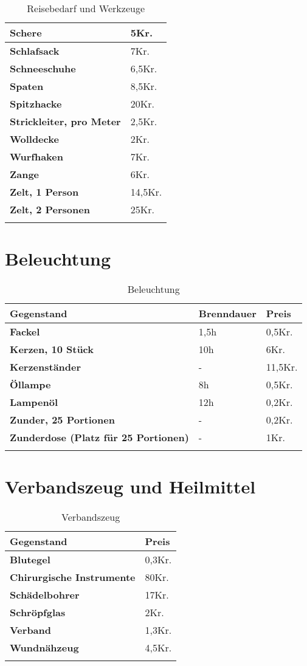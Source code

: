 \begin{longtable}{|p{5cm}|p{2cm}|}
\textbf{Schere} & 5Kr. \\ \hline
\textbf{Schlafsack} & 7Kr. \\ \hline
\textbf{Schneeschuhe} & 6,5Kr. \\ \hline
\textbf{Spaten} & 8,5Kr. \\ \hline
\textbf{Spitzhacke} & 20Kr. \\ \hline
\textbf{Strickleiter, pro Meter} & 2,5Kr. \\ \hline
\textbf{Wolldecke} & 2Kr. \\ \hline
\textbf{Wurfhaken} & 7Kr. \\ \hline
\textbf{Zange} & 6Kr. \\ \hline
\textbf{Zelt, 1 Person} & 14,5Kr. \\ \hline
\textbf{Zelt, 2 Personen} & 25Kr. \\ \hline

\caption{Reisebedarf und Werkzeuge}
\label{tab:ReisebedarfUndWerkzeuge}
\end{longtable}


\section{Beleuchtung}
\begin{longtable}{|p{5cm}|p{2cm}|p{2cm}|}
\hline
\textbf{Gegenstand} & \textbf{Brenndauer} & \textbf{Preis} \\ \hline
\textbf{Fackel} & 1,5h & 0,5Kr. \\ \hline
\textbf{Kerzen, 10 Stück} & 10h & 6Kr. \\ \hline
\textbf{Kerzenständer} & - & 11,5Kr. \\ \hline
\textbf{Öllampe} & 8h & 0,5Kr. \\ \hline
\textbf{Lampenöl} & 12h & 0,2Kr. \\ \hline
\textbf{Zunder, 25 Portionen} & - & 0,2Kr. \\ \hline
\textbf{Zunderdose (Platz für 25 Portionen)} & - & 1Kr. \\ \hline

\caption{Beleuchtung}
\label{tab:Beleuchtung}
\end{longtable}


\section{Verbandszeug und Heilmittel}
\begin{longtable}{|p{5cm}|p{2cm}|}
\hline
\textbf{Gegenstand} & \textbf{Preis} \\ \hline
\textbf{Blutegel} & 0,3Kr. \\ \hline
\textbf{Chirurgische Instrumente} & 80Kr. \\ \hline
\textbf{Schädelbohrer} & 17Kr. \\ \hline
\textbf{Schröpfglas} & 2Kr. \\ \hline
\textbf{Verband} & 1,3Kr. \\ \hline
\textbf{Wundnähzeug} & 4,5Kr. \\ \hline

\caption{Verbandszeug}
\label{tab:Verbandszeug}
\end{longtable}

